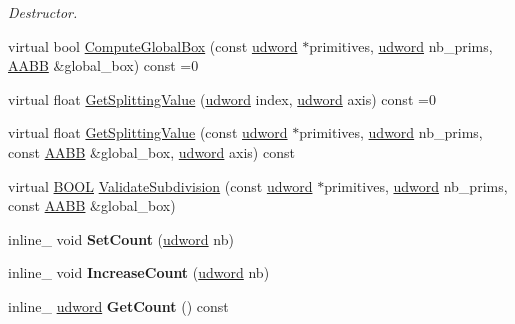 \begin{DoxyCompactItemize}
\begin{DoxyCompactList}\small\item\em Destructor. \end{DoxyCompactList}\item 
virtual bool \hyperlink{class_a_a_b_b_tree_builder_adde85a9974ea5dc2c74fd851e11abf75}{Compute\+Global\+Box} (const \hyperlink{_ice_types_8h_a44c6f1920ba5551225fb534f9d1a1733}{udword} $\ast$primitives, \hyperlink{_ice_types_8h_a44c6f1920ba5551225fb534f9d1a1733}{udword} nb\+\_\+prims, \hyperlink{class_a_a_b_b}{A\+A\+B\+B} \&global\+\_\+box) const =0
\item 
virtual float \hyperlink{class_a_a_b_b_tree_builder_acf08d2d4275763e25585aa240e641be1}{Get\+Splitting\+Value} (\hyperlink{_ice_types_8h_a44c6f1920ba5551225fb534f9d1a1733}{udword} index, \hyperlink{_ice_types_8h_a44c6f1920ba5551225fb534f9d1a1733}{udword} axis) const =0
\item 
virtual float \hyperlink{class_a_a_b_b_tree_builder_a1386f18541381a799c444ac22ef1e241}{Get\+Splitting\+Value} (const \hyperlink{_ice_types_8h_a44c6f1920ba5551225fb534f9d1a1733}{udword} $\ast$primitives, \hyperlink{_ice_types_8h_a44c6f1920ba5551225fb534f9d1a1733}{udword} nb\+\_\+prims, const \hyperlink{class_a_a_b_b}{A\+A\+B\+B} \&global\+\_\+box, \hyperlink{_ice_types_8h_a44c6f1920ba5551225fb534f9d1a1733}{udword} axis) const 
\item 
virtual \hyperlink{_ice_types_8h_a050c65e107f0c828f856a231f4b4e788}{B\+O\+O\+L} \hyperlink{class_a_a_b_b_tree_builder_a72c6fb9928720a2d6d997959335e6dab}{Validate\+Subdivision} (const \hyperlink{_ice_types_8h_a44c6f1920ba5551225fb534f9d1a1733}{udword} $\ast$primitives, \hyperlink{_ice_types_8h_a44c6f1920ba5551225fb534f9d1a1733}{udword} nb\+\_\+prims, const \hyperlink{class_a_a_b_b}{A\+A\+B\+B} \&global\+\_\+box)
\item 
\hypertarget{class_a_a_b_b_tree_builder_a47983eff336e89e78e452a8683a5e4d7}{inline\+\_\+ void {\bfseries Set\+Count} (\hyperlink{_ice_types_8h_a44c6f1920ba5551225fb534f9d1a1733}{udword} nb)}\label{class_a_a_b_b_tree_builder_a47983eff336e89e78e452a8683a5e4d7}

\item 
\hypertarget{class_a_a_b_b_tree_builder_ae9a3c783c6f9c386c78d98474780cbdd}{inline\+\_\+ void {\bfseries Increase\+Count} (\hyperlink{_ice_types_8h_a44c6f1920ba5551225fb534f9d1a1733}{udword} nb)}\label{class_a_a_b_b_tree_builder_ae9a3c783c6f9c386c78d98474780cbdd}

\item 
\hypertarget{class_a_a_b_b_tree_builder_a491ed2f10111692ca0816c56561f20d8}{inline\+\_\+ \hyperlink{_ice_types_8h_a44c6f1920ba5551225fb534f9d1a1733}{udword} {\bfseries Get\+Count} () const }\label{class_a_a_b_b_tree_builder_a491ed2f10111692ca0816c56561f20d8}


\end{DoxyCompactItemize}
